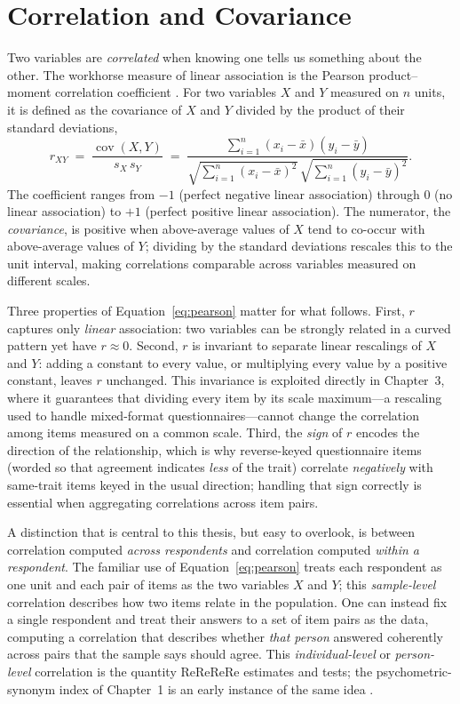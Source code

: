 \section{Correlation and Covariance}
\label{sec:corr}

Two variables are \emph{correlated} when knowing one tells us something about
the other. The workhorse measure of linear association is the Pearson
product--moment correlation coefficient \parencite{pearson1896mathematical}.
For two variables $X$ and $Y$ measured on $n$ units, it is defined as the
covariance of $X$ and $Y$ divided by the product of their standard deviations,
\begin{equation}
r_{XY} \;=\; \frac{\operatorname{cov}(X,Y)}{s_X\, s_Y}
\;=\; \frac{\sum_{i=1}^{n}(x_i-\bar{x})(y_i-\bar{y})}
{\sqrt{\sum_{i=1}^{n}(x_i-\bar{x})^2}\,\sqrt{\sum_{i=1}^{n}(y_i-\bar{y})^2}} .
\label{eq:pearson}
\end{equation}
The coefficient ranges from $-1$ (perfect negative linear association) through
$0$ (no linear association) to $+1$ (perfect positive linear association). The
numerator, the \emph{covariance}, is positive when above-average values of $X$
tend to co-occur with above-average values of $Y$; dividing by the standard
deviations rescales this to the unit interval, making correlations comparable
across variables measured on different scales.

Three properties of Equation~\ref{eq:pearson} matter for what follows. First,
$r$ captures only \emph{linear} association: two variables can be strongly
related in a curved pattern yet have $r \approx 0$. Second, $r$ is invariant to
separate linear rescalings of $X$ and $Y$: adding a constant to every value, or
multiplying every value by a positive constant, leaves $r$ unchanged. This
invariance is exploited directly in Chapter~3, where it guarantees that
dividing every item by its scale maximum---a rescaling used to handle
mixed-format questionnaires---cannot change the correlation among items measured
on a common scale. Third, the \emph{sign} of $r$ encodes the direction of the
relationship, which is why reverse-keyed questionnaire items (worded so that
agreement indicates \emph{less} of the trait) correlate \emph{negatively} with
same-trait items keyed in the usual direction; handling that sign correctly is
essential when aggregating correlations across item pairs.

A distinction that is central to this thesis, but easy to overlook, is between
correlation computed \emph{across respondents} and correlation computed
\emph{within a respondent}. The familiar use of Equation~\ref{eq:pearson} treats
each respondent as one unit and each pair of items as the two variables $X$ and
$Y$; this \emph{sample-level} correlation describes how two items relate in the
population. One can instead fix a single respondent and treat their answers to a
set of item pairs as the data, computing a correlation that describes whether
\emph{that person} answered coherently across pairs that the sample says should
agree. This \emph{individual-level} or \emph{person-level} correlation is the
quantity ReReReRe estimates and tests; the psychometric-synonym index of
Chapter~1 is an early instance of the same idea
\parencite{meade2012identifying}.

